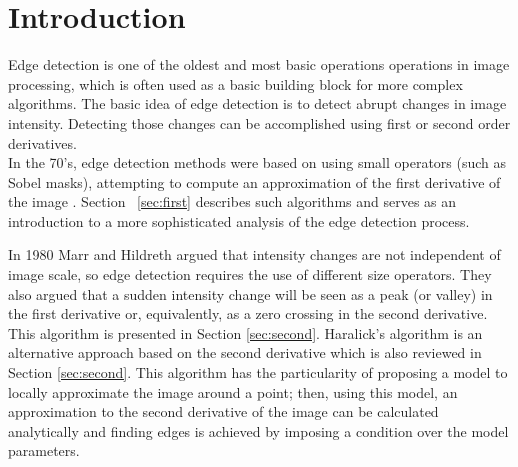 \documentclass{ipol}
\numberwithin{equation}{section}
\numberwithin{table}{section}
\begin{document}




\section{Introduction}
\label{sec:intro}

Edge detection is one of the oldest and most basic operations operations in image processing, which is often used as a basic building block for more complex algorithms. The basic idea of edge detection is to detect abrupt changes in image intensity. 
Detecting those changes can be accomplished using first or second order derivatives. \\

In the 70's, edge detection methods were based on using small operators 
(such as Sobel masks), attempting to compute an approximation of the
first derivative of the image \cite{Gonzalez2007Digital}. Section ~\ref{sec:first} describes such algorithms 
and serves as an introduction to a more sophisticated 
analysis of the edge detection process.

In 1980 Marr and Hildreth \cite{AIM-518} argued that intensity changes are not independent 
of image scale, so edge detection requires the use of different size 
operators. They also argued that a sudden intensity change will be seen 
as a peak (or valley) in the first derivative or, equivalently, as a zero 
crossing in the second derivative. This algorithm is presented in Section \ref{sec:second}. 
Haralick's algorithm \cite{bb20239} is an alternative approach based on the second derivative 
which is also reviewed in Section \ref{sec:second}. This algorithm has the particularity of 
proposing a model to locally approximate the image around a point; then, using this model, 
an approximation to the second derivative of the image can be calculated analytically and 
finding edges is achieved by imposing a condition over the model parameters. 
\end{document}
